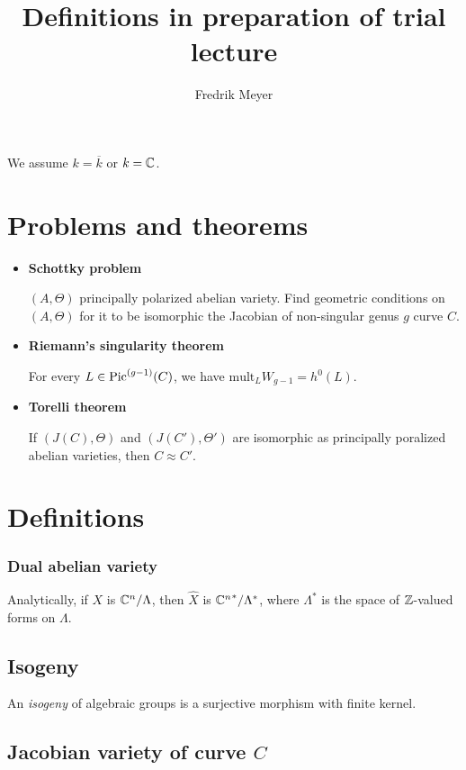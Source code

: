 \documentclass[11pt, english]{article}
\title{Definitions in preparation of trial lecture}
\author{Fredrik Meyer}
\date{}
\begin{document}
  
\maketitle

We assume $k = \overline{k}$ or $k=\mathbb{C}$.

\section{Problems and theorems}

\begin{itemize}
	\item \textbf{Schottky problem}

	$(A,\Theta)$ principally polarized abelian variety. Find geometric conditions on $(A,\Theta)$ for it to be isomorphic the Jacobian of non-singular genus $g$ curve $C$.
	\item \textbf{Riemann's singularity theorem}

	For every $L \in \operatorname{Pic}^{(g-1)}(C)$, we have $\mathrm{mult}_L W_{g-1} = h^0(L)$.
	\item \textbf{Torelli theorem}

	If $(J(C), \Theta)$ and $(J(C'),\Theta')$ are isomorphic as principally poralized abelian varieties, then $C \approx C'$.
\end{itemize}

\section{Definitions}

\subsubsection{Dual abelian variety} %
\label{ssub:dual_abelian_variety}

Analytically, if $X$ is $\mathbb{C}^n/\Lambda$, then $\hat X$ is ${\mathbb{C}^n}^\ast/\Lambda^\ast$,  where $\Lambda^\ast$ is the space of $\mathbb{Z}$-valued forms on $\Lambda$.


\subsection{Isogeny}

An \emph{isogeny} of algebraic groups is a surjective morphism with finite kernel.

\subsection{Jacobian variety of curve $C$}
\end{document}

